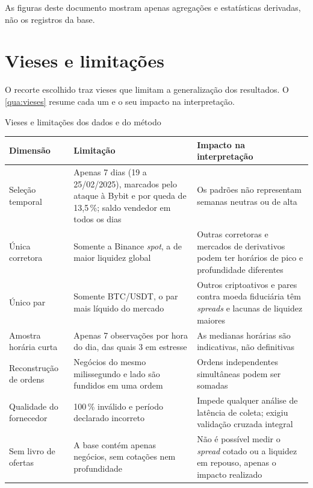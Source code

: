 As figuras deste documento mostram apenas agregações e estatísticas derivadas,
não os registros da base.

\section{Vieses e limitações}\label{sec:vieses}

O recorte escolhido traz vieses que limitam a generalização dos resultados. O
\autoref{qua:vieses} resume cada um e o seu impacto na interpretação.

\begin{quadro}[htbp]
\caption{\label{qua:vieses}Vieses e limitações dos dados e do método}
\begin{corpotabela}
\begin{tabularx}{\textwidth}{|L{3.3cm}|Y|L{5.0cm}|}
\hline
\textbf{Dimensão} & \textbf{Limitação} & \textbf{Impacto na interpretação} \\ \hline
Seleção temporal & Apenas 7 dias (19 a 25/02/2025), marcados pelo ataque à Bybit e por queda de 13,5\,\%; saldo vendedor em todos os dias & Os padrões não representam semanas neutras ou de alta \\ \hline
Única corretora & Somente a Binance \textit{spot}, a de maior liquidez global & Outras corretoras e mercados de derivativos podem ter horários de pico e profundidade diferentes \\ \hline
Único par & Somente BTC/USDT, o par mais líquido do mercado & Outros criptoativos e pares contra moeda fiduciária têm \textit{spreads} e lacunas de liquidez maiores \\ \hline
Amostra horária curta & Apenas 7 observações por hora do dia, das quais 3 em estresse & As medianas horárias são indicativas, não definitivas \\ \hline
Reconstrução de ordens & Negócios do mesmo milissegundo e lado são fundidos em uma ordem & Ordens independentes simultâneas podem ser somadas \\ \hline
Qualidade do fornecedor &  100\,\% inválido e período declarado incorreto & Impede qualquer análise de latência de coleta; exigiu validação cruzada integral \\ \hline
Sem livro de ofertas & A base contém apenas negócios, sem cotações nem profundidade & Não é possível medir o \textit{spread} cotado ou a liquidez em repouso, apenas o impacto realizado \\ \hline
\end{tabularx}
\end{corpotabela}
\fonteautores[Elaborado]
\end{quadro}

